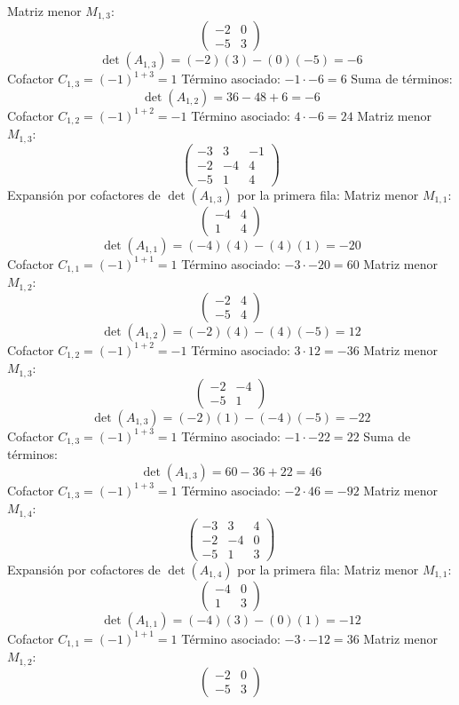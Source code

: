 \documentclass{article}
\begin{document}
Matriz menor $M_{1,3}$:
\[\begin{pmatrix}-2 & 0 \\ -5 & 3\end{pmatrix}\]
\[\det(A_{1,3}) = (-2)(3) - (0)(-5) = -6\]
Cofactor $C_{1,3} = (-1)^{1+3} = 1$
Término asociado: $ -1 \cdot -6 = 6 $
Suma de términos:
\[\det(A_{1,2}) = 36 - 48 + 6 = -6\]
Cofactor $C_{1,2} = (-1)^{1+2} = -1$
Término asociado: $ 4 \cdot -6 = 24 $
Matriz menor $M_{1,3}$:
\[\begin{pmatrix}-3 & 3 & -1 \\ -2 & -4 & 4 \\ -5 & 1 & 4\end{pmatrix}\]
Expansión por cofactores de $\det(A_{1,3})$ por la primera fila:
Matriz menor $M_{1,1}$:
\[\begin{pmatrix}-4 & 4 \\ 1 & 4\end{pmatrix}\]
\[\det(A_{1,1}) = (-4)(4) - (4)(1) = -20\]
Cofactor $C_{1,1} = (-1)^{1+1} = 1$
Término asociado: $ -3 \cdot -20 = 60 $
Matriz menor $M_{1,2}$:
\[\begin{pmatrix}-2 & 4 \\ -5 & 4\end{pmatrix}\]
\[\det(A_{1,2}) = (-2)(4) - (4)(-5) = 12\]
Cofactor $C_{1,2} = (-1)^{1+2} = -1$
Término asociado: $ 3 \cdot 12 = -36 $
Matriz menor $M_{1,3}$:
\[\begin{pmatrix}-2 & -4 \\ -5 & 1\end{pmatrix}\]
\[\det(A_{1,3}) = (-2)(1) - (-4)(-5) = -22\]
Cofactor $C_{1,3} = (-1)^{1+3} = 1$
Término asociado: $ -1 \cdot -22 = 22 $
Suma de términos:
\[\det(A_{1,3}) = 60 - 36 + 22 = 46\]
Cofactor $C_{1,3} = (-1)^{1+3} = 1$
Término asociado: $ -2 \cdot 46 = -92 $
Matriz menor $M_{1,4}$:
\[\begin{pmatrix}-3 & 3 & 4 \\ -2 & -4 & 0 \\ -5 & 1 & 3\end{pmatrix}\]
Expansión por cofactores de $\det(A_{1,4})$ por la primera fila:
Matriz menor $M_{1,1}$:
\[\begin{pmatrix}-4 & 0 \\ 1 & 3\end{pmatrix}\]
\[\det(A_{1,1}) = (-4)(3) - (0)(1) = -12\]
Cofactor $C_{1,1} = (-1)^{1+1} = 1$
Término asociado: $ -3 \cdot -12 = 36 $
Matriz menor $M_{1,2}$:
\[\begin{pmatrix}-2 & 0 \\ -5 & 3\end{pmatrix}\]
\end{document}
